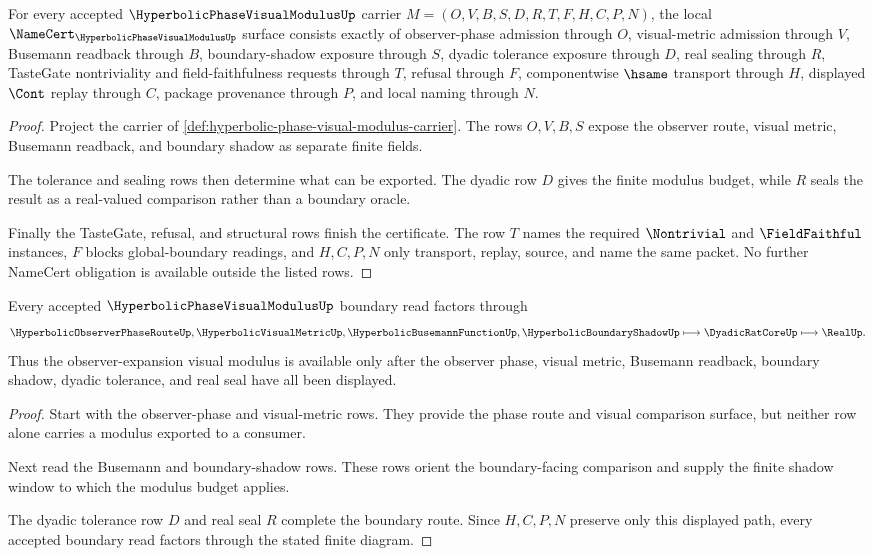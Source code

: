 \begin{theorem}
\label{thm:hyperbolic-phase-visual-modulus-namecert-obligations}
For every accepted $\HyperbolicPhaseVisualModulusUp$ carrier $M=(O,V,B,S,D,R,T,F,H,C,P,N)$, the local $\NameCert_{\HyperbolicPhaseVisualModulusUp}$ surface consists exactly of observer-phase admission through $O$, visual-metric admission through $V$, Busemann readback through $B$, boundary-shadow exposure through $S$, dyadic tolerance exposure through $D$, real sealing through $R$, TasteGate nontriviality and field-faithfulness requests through $T$, refusal through $F$, componentwise $\hsame$ transport through $H$, displayed $\Cont$ replay through $C$, package provenance through $P$, and local naming through $N$.
\end{theorem}
\begin{proof}
Project the carrier of \autoref{def:hyperbolic-phase-visual-modulus-carrier}. The rows $O,V,B,S$ expose the observer route, visual metric, Busemann readback, and boundary shadow as separate finite fields.

The tolerance and sealing rows then determine what can be exported. The dyadic row $D$ gives the finite modulus budget, while $R$ seals the result as a real-valued comparison rather than a boundary oracle.

Finally the TasteGate, refusal, and structural rows finish the certificate. The row $T$ names the required $\Nontrivial$ and $\FieldFaithful$ instances, $F$ blocks global-boundary readings, and $H,C,P,N$ only transport, replay, source, and name the same packet. No further NameCert obligation is available outside the listed rows.
\end{proof}

\begin{theorem}
\label{thm:hyperbolic-phase-visual-modulus-boundary-route}
Every accepted $\HyperbolicPhaseVisualModulusUp$ boundary read factors through
$$
\HyperbolicObserverPhaseRouteUp,\HyperbolicVisualMetricUp,\HyperbolicBusemannFunctionUp,\HyperbolicBoundaryShadowUp \longmapsto \DyadicRatCoreUp \longmapsto \RealUp .
$$
Thus the observer-expansion visual modulus is available only after the observer phase, visual metric, Busemann readback, boundary shadow, dyadic tolerance, and real seal have all been displayed.
\end{theorem}
\begin{proof}
Start with the observer-phase and visual-metric rows. They provide the phase route and visual comparison surface, but neither row alone carries a modulus exported to a consumer.

Next read the Busemann and boundary-shadow rows. These rows orient the boundary-facing comparison and supply the finite shadow window to which the modulus budget applies.

The dyadic tolerance row $D$ and real seal $R$ complete the boundary route. Since $H,C,P,N$ preserve only this displayed path, every accepted boundary read factors through the stated finite diagram.
\end{proof}


